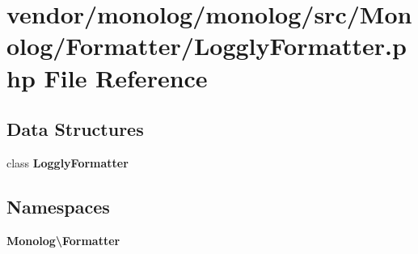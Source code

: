 \section{vendor/monolog/monolog/src/\+Monolog/\+Formatter/\+Loggly\+Formatter.php File Reference}
\label{_loggly_formatter_8php}
\subsection*{Data Structures}
\begin{DoxyCompactItemize}
\item 
class {\bf Loggly\+Formatter}
\end{DoxyCompactItemize}
\subsection*{Namespaces}
\begin{DoxyCompactItemize}
\item 
 {\bf Monolog\textbackslash{}\+Formatter}
\end{DoxyCompactItemize}
